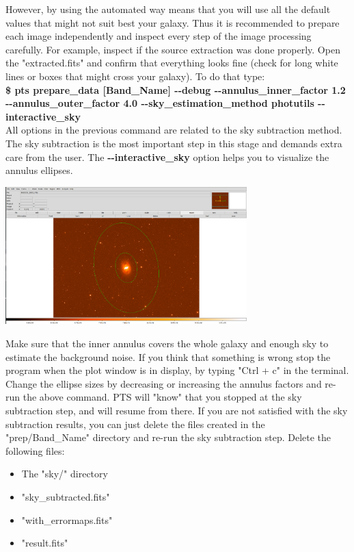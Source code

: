 \documentclass[15pt,a4paper,oneside,openright]{report}
\begin{document}
However, by using the automated way means that you will use all the default values that might not suit best your galaxy. Thus it is recommended to prepare each image independently and inspect every step of the image processing carefully. For example, inspect if the source extraction was done properly. Open 
the "extracted.fits" and confirm that everything looks fine (check for long white lines or boxes that might cross your galaxy). To do that type:\\    

\textbf{\$ pts prepare\_data [Band\_Name] -{}-debug -{}-annulus\_inner\_factor 1.2 -{}-annulus\_outer\_factor 4.0 -{}-sky\_estimation\_method photutils -{}-interactive\_sky}\\

All options in the previous command are related to the sky subtraction method. The sky subtraction is the most important step in this stage and demands extra care 
from the user. The \textbf{-{}-interactive\_sky} option helps you to visualize the annulus ellipses.\\ 

\begin{center}
\includegraphics[width=0.7\textwidth]{figures/sky_sub_annulus.png}
\end{center}

Make sure that the inner annulus covers the whole galaxy 
and enough sky to estimate the background noise. If you think that something is wrong stop the program when the plot window is in display, by typing "Ctrl + c" in the terminal. Change the ellipse sizes by decreasing or increasing the annulus factors and re-run the above command. PTS will "know" that you stopped at the sky subtraction step, and will resume from there. If you are not satisfied with the sky subtraction results, you can just delete the files created in the 
"prep/Band\_Name" directory and re-run the sky subtraction step. Delete the following files:

\begin{itemize}
	\item The "sky/" directory
	\item "sky\_subtracted.fits"
	\item "with\_errormaps.fits"
	\item "result.fits"
\end{itemize}
\end{document}
